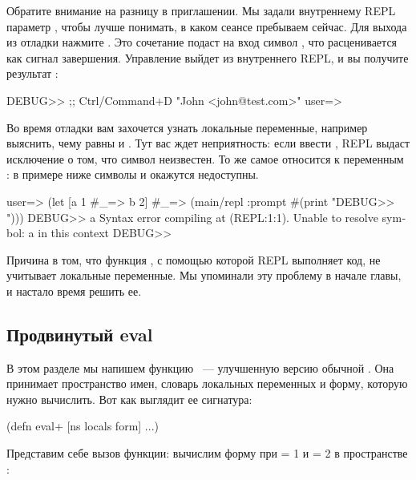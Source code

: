 Обратите внимание на разницу в приглашении. Мы задали внутреннему REPL параметр , чтобы лучше понимать, в каком сеансе пребываем сейчас. Для выхода из отладки нажмите . Это сочетание подаст на вход символ , что расценивается как сигнал завершения. Управление выйдет из внутреннего REPL, и вы получите результат :

\begin{english}
  \begin{text}
DEBUG>> ;; Ctrl/Command+D
"John <john@test.com>"
user=>
  \end{text}
\end{english}

Во время отладки вам захочется узнать локальные переменные, например выяснить, чему равны  и . Тут вас ждет неприятность: если ввести , REPL выдаст исключение о том, что символ неизвестен. То же самое относится к переменным : в примере ниже символы  и  окажутся недоступны.

\begin{english}
  \begin{text}
user=> (let [a 1
  #_=>       b 2]
  #_=>   (main/repl :prompt #(print "DEBUG>> ")))
DEBUG>> a
Syntax error compiling at (REPL:1:1).
Unable to resolve symbol: a in this context
DEBUG>>
  \end{text}
\end{english}

Причина в том, что функция , с помощью которой REPL выполняет код, не учитывает локальные переменные. Мы упоминали эту проблему в начале главы, и настало время решить ее.

\subsection{Продвинутый eval}

В этом разделе мы напишем функцию ~--- улучшенную версию обычной . Она принимает пространство имен, словарь локальных переменных и форму, которую нужно вычислить. Вот как выглядит ее сигнатура:

\begin{english}
  \begin{clojure}
(defn eval+ [ns locals form]
  ...)
  \end{clojure}
\end{english}

Представим себе вызов функции: вычислим форму  при  = 1 и  = 2 в пространстве :


